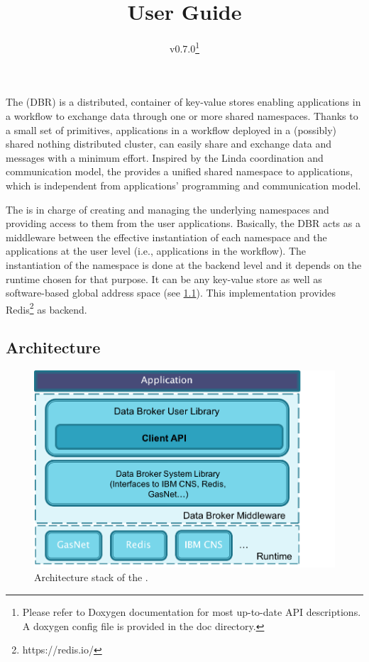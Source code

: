 
\newcommand{\ilist}[1]{\lstinline[style=myinlinestyle,basicstyle=\ttfamily,]{#1}}

\title{\databroker User Guide}
\date{v0.7.0\footnote{Please refer to Doxygen documentation for most
    up-to-date API descriptions. A doxygen config file is provided in
    the doc directory.}}


\maketitle
\section{\databroker}
\label{sec:interface}

The \databroker (DBR) is a distributed, container of key-value stores
enabling applications in a workflow to exchange data through one or
more shared namespaces.  Thanks to a small set of primitives,
applications in a workflow deployed in a (possibly) shared nothing
distributed cluster, can easily share and exchange data and messages
with a minimum effort. Inspired by the Linda coordination and
communication model, the \databroker provides a unified shared
namespace to applications, which is independent from applications'
programming and communication model.



The \databroker is in charge of creating and managing the underlying
namespaces and providing access to them from the user applications.
Basically, the DBR acts as a middleware between the effective
instantiation of each namespace and the applications at the user level
(i.e., applications in the workflow).  The instantiation of the
namespace is done at the backend level and it depends on the runtime
chosen for that purpose. It can be any key-value store as well as
software-based global address space (see \ref{sec:arch}). This
implementation provides Redis\footnote{https://redis.io/} as backend.

\subsection{Architecture}
\label{sec:arch}
\begin{figure}[!htb]
	\centering
	\includegraphics[width=0.7\linewidth]{fig/architecture}
	\caption{Architecture stack of the \databroker.}
	\label{fig:architecture}
\end{figure}


